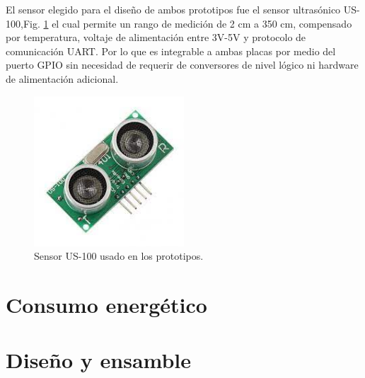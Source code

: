 El sensor elegido para el diseño de ambos prototipos fue el sensor ultrasónico US-100,Fig. \ref{fig:sensor-US100} el cual permite un 
rango de medición de 2 cm a 350 cm, compensado por temperatura, voltaje de alimentación entre 3V-5V y protocolo de 
comunicación UART. Por lo que es integrable a ambas placas por medio del puerto GPIO sin necesidad de requerir de conversores de nivel lógico 
ni hardware de alimentación adicional.
\begin{figure}
    \centering
    \includegraphics[width=0.5\textwidth]{imgs/us-100.jpg}
    \caption{Sensor US-100 usado en los prototipos.}
    \label{fig:sensor-US100}
\end{figure}

\section{Consumo energético}

\section{Diseño y ensamble}